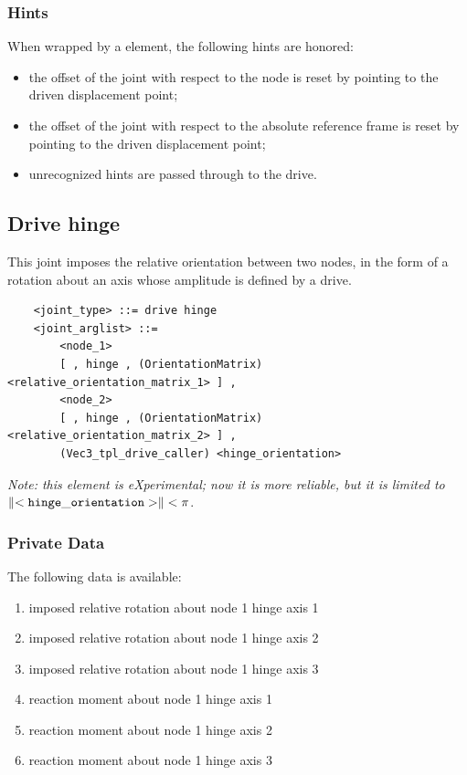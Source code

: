 \subsubsection{Hints}
When wrapped by a  element, the following hints are honored:
\begin{itemize}
\item {} the offset of the joint
with respect to the node is reset by pointing 
to the driven displacement point;
\item {} the offset of the joint
with respect to the absolute reference frame is reset by pointing
to the driven displacement point;
\item unrecognized hints are passed through to the  drive.
\end{itemize}



\subsection{Drive hinge}
\label{sec:EL:JOINT:DRIVEHINGE}
This joint imposes the relative orientation between two nodes,
in the form of a rotation about an axis whose amplitude is defined
by a drive.
\begin{verbatim}
    <joint_type> ::= drive hinge
    <joint_arglist> ::= 
        <node_1>
        [ , hinge , (OrientationMatrix) <relative_orientation_matrix_1> ] ,
        <node_2> 
        [ , hinge , (OrientationMatrix) <relative_orientation_matrix_2> ] ,
        (Vec3_tpl_drive_caller) <hinge_orientation>
\end{verbatim}
\emph{Note: this element is eXperimental; now it is more reliable, 
but it is limited to $\left\| \tt <hinge\_orientation> \right\| < \pi$}.

\subsubsection{Private Data}
The following data is available:
\begin{enumerate}
\item {} imposed relative rotation about node 1 hinge axis 1
\item {} imposed relative rotation about node 1 hinge axis 2
\item {} imposed relative rotation about node 1 hinge axis 3
\item {} reaction moment about node 1 hinge axis 1
\item {} reaction moment about node 1 hinge axis 2
\item {} reaction moment about node 1 hinge axis 3
\end{enumerate}

